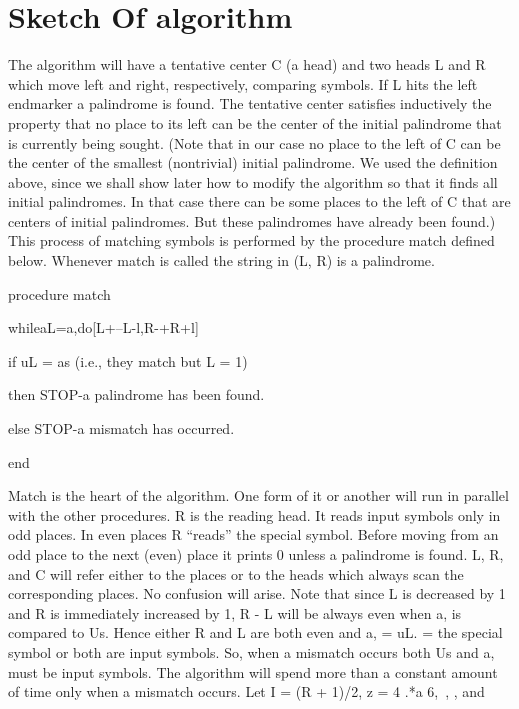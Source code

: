 \documentclass[11pt,a4paper]{report}
\begin{document}
\chapter{Sketch Of algorithm}

The algorithm will have a tentative center C (a head) and two heads L and R which
move left and right, respectively, comparing symbols. If L hits the left endmarker a
palindrome is found. The tentative center satisfies inductively the property that no place
to its left can be the center of the initial palindrome that is currently being sought.
(Note that in our case no place to the left of C can be the center of the smallest (nontrivial)
initial palindrome. We used the definition above, since we shall show later how to modify
the algorithm so that it finds all initial palindromes. In that case there can be some places
to the left of C that are centers of initial palindromes. But these palindromes have already
been found.) This process of matching symbols is performed by the procedure match
defined below. Whenever match is called the string in (L, R) is a palindrome.

procedure match
\begin{myindentpar}{3cm}

whileaL=a,do[L+--L-l,R-+R+l]
\begin{myindentpar}{3cm}

if uL = as (i.e., they match but L = 1)
\begin{myindentpar}{3cm}

then STOP-a palindrome has been found.
\end{myindentpar}

else STOP-a mismatch has occurred.

\end{myindentpar}

\end{myindentpar}

end

Match is the heart of the algorithm. One form of it or another will run in parallel with
the other procedures. R is the reading head. It reads input symbols only in odd places.
In even places R “reads” the special symbol. Before moving from an odd place to the
next (even) place it prints 0 unless a palindrome is found. L, R, and C will refer either to
the places or to the heads which always scan the corresponding places. No confusion will
arise. Note that since L is decreased by 1 and R is immediately increased by 1, R - L
will be always even when a, is compared to Us. Hence either R and L are both even and
a, = uL. = the special symbol or both are input symbols. So, when a mismatch occurs
both Us and a, must be input symbols. The algorithm will spend more than a constant
amount of time only when a mismatch occurs. Let I = (R + 1)/2, z = 4 .*a 6,~, , and 
\end{document}
